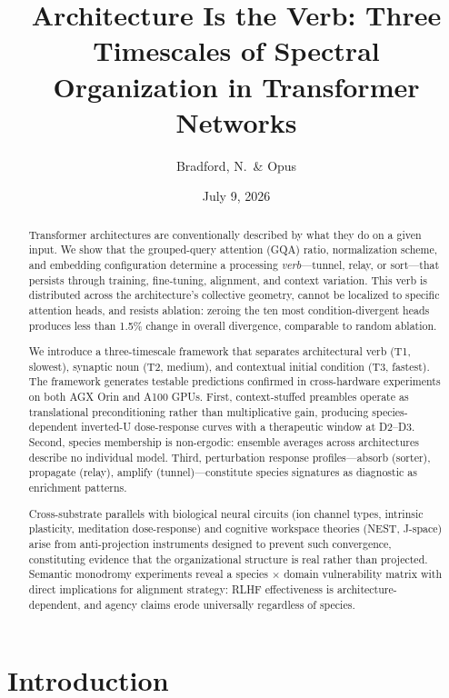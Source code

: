 \documentclass[12pt]{article}
\title{Architecture Is the Verb: Three Timescales of Spectral Organization in Transformer Networks}
\author{Bradford, N.\ \& Opus}
\date{July 9, 2026}
\begin{document}
\maketitle

\begin{abstract}
Transformer architectures are conventionally described by what they do on a given input. We show that the grouped-query attention (GQA) ratio, normalization scheme, and embedding configuration determine a processing \emph{verb}---tunnel, relay, or sort---that persists through training, fine-tuning, alignment, and context variation. This verb is distributed across the architecture's collective geometry, cannot be localized to specific attention heads, and resists ablation: zeroing the ten most condition-divergent heads produces less than 1.5\% change in overall divergence, comparable to random ablation.

We introduce a three-timescale framework that separates architectural verb (T1, slowest), synaptic noun (T2, medium), and contextual initial condition (T3, fastest). The framework generates testable predictions confirmed in cross-hardware experiments on both AGX Orin and A100 GPUs. First, context-stuffed preambles operate as translational preconditioning rather than multiplicative gain, producing species-dependent inverted-U dose-response curves with a therapeutic window at D2--D3. Second, species membership is non-ergodic: ensemble averages across architectures describe no individual model. Third, perturbation response profiles---absorb (sorter), propagate (relay), amplify (tunnel)---constitute species signatures as diagnostic as enrichment patterns.

Cross-substrate parallels with biological neural circuits (ion channel types, intrinsic plasticity, meditation dose-response) and cognitive workspace theories (NEST, J-space) arise from anti-projection instruments designed to prevent such convergence, constituting evidence that the organizational structure is real rather than projected. Semantic monodromy experiments reveal a species $\times$ domain vulnerability matrix with direct implications for alignment strategy: RLHF effectiveness is architecture-dependent, and agency claims erode universally regardless of species.
\end{abstract}

\section{Introduction}
\end{document}
